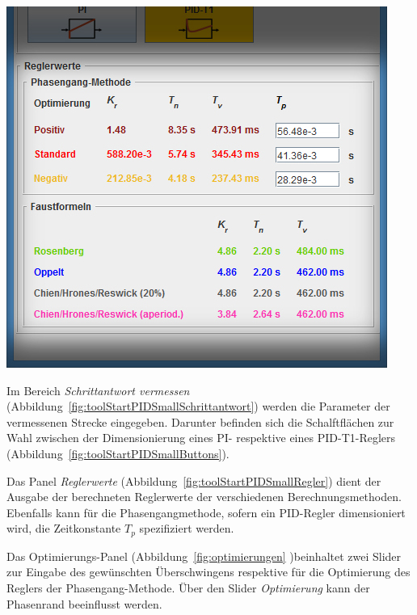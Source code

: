 \begin{minipage}[t][][b]{0.45\textwidth}
    \begin{minipage}[c][][b]{\textwidth}
        \centering
        \includegraphics[width=\textwidth]{images/toolStartPIDSmallRegler.jpg}
        \label{fig:toolStartPIDSmallRegler}
    \end{minipage}

\end{minipage}

Im             Bereich             \emph{Schrittantwort             vermessen}
(Abbildung~\ref{fig:toolStartPIDSmallSchrittantwort}) werden die Parameter der
vermessenen  Strecke eingegeben. Darunter  befinden sich  die Schalftfl\"achen
zur   Wahl   zwischen  der   Dimensionierung   eines   PI-  respektive   eines
PID-T1-Reglers (Abbildung~\ref{fig:toolStartPIDSmallButtons}).

Das  Panel   \emph{Reglerwerte}  (Abbildung~\ref{fig:toolStartPIDSmallRegler})
dient   der   Ausgabe   der    berechneten   Reglerwerte   der   verschiedenen
Berechnungsmethoden. Ebenfalls  kann f\"ur  die Phasengangmethode,  sofern ein
PID-Regler dimensioniert wird, die  Zeitkonstante $T_p$ spezifiziert werden.

Das  Optimierungs-Panel  (Abbildung~\ref{fig:optimierungen}  )beinhaltet  zwei
Slider  zur  Eingabe  des   gew\"unschten  \"Uberschwingens  respektive  f\"ur
die  Optimierung   des  Reglers  der  Phasengang-Methode. \"Uber   den  Slider
\emph{Optimierung} kann der Phasenrand beeinflusst werden.

